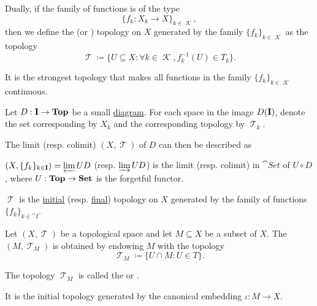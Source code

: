 \begin{definition}\label{def:final_topology}
  Dually, if the family of functions is of the type
  \begin{equation*}
    \{ f_k: X_k \to X \}_{k \in \mscrK},
  \end{equation*}
  then we define the  (or ) topology on \( X \) generated by the family \( \{ f_k \}_{k \in \mscrK} \) as the topology
  \begin{equation*}
    \mscrT \coloneqq \{ U \subseteq X \colon \forall k \in \mscrK, f_k^{-1}(U) \in T_k \}.
  \end{equation*}

  It is the strongest topology that makes all functions in the family \( \{ f_k \}_{k \in \mscrK} \) continuous.
\end{definition}

\begin{proposition}\label{thm:initial_final_topology_limit}
  Let \( D: \op* I \to \cat{Top} \) be a small \hyperref[def:categorical_diagram]{diagram}. For each space in the image \( D(\op* I) \), denote the set corresponding by \( X_k \) and the corresponding topology by \( \mscrT_k \).

  The limit (resp. colimit) \( (X, \mscrT) \) of \( D \) can then be described as
  \begin{thmenum}
    \item \( (X, \{ f_k \}_{k \in \cat{I}}) = \varprojlim UD \) (resp. \( \varinjlim UD \)) is the limit (resp. colimit) in \( \cat{Set} \) of \( U \circ D \), where \( U: \op*{Top} \to \cat{Set} \) is the forgetful functor.
    \item \( \mscrT \) is the \hyperref[def:initial_topology]{initial} (resp. \hyperref[def:final_topology]{final}) topology on \( X \) generated by the family of functions \( \{ f_k \}_{k \in \cat{I}} \).
  \end{thmenum}
\end{proposition}

\begin{definition}\label{def:topological_subspace}
  Let \( (X, \mscrT) \) be a topological space and let \( M \subseteq X \) be a subset of \( X \). The  \( (M, \mscrT_M) \) is obtained by endowing \( M \) with the topology
  \begin{equation*}
    \mscrT_M \coloneqq \{ U \cap M \colon U \in T \}.
  \end{equation*}

  The topology \( \mscrT_M \) is called the  or .

  It is the initial topology generated by the canonical embedding \( \iota: M \to X \).
\end{definition}

